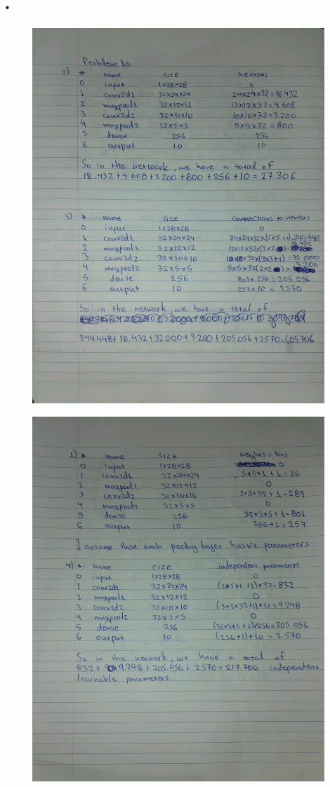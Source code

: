 \documentclass{article}
\begin{document}
\section{.}
\begin{figure}[htp]
    \centering
    \includegraphics[width=11cm]{photos/10_1.jpg}
    \label{fig:2}
\end{figure}
\begin{figure}[htp]
    \centering
    \includegraphics[width=11cm]{photos/10_2.jpg}
    \label{fig:2}
\end{figure}
\newpage
\end{document}
